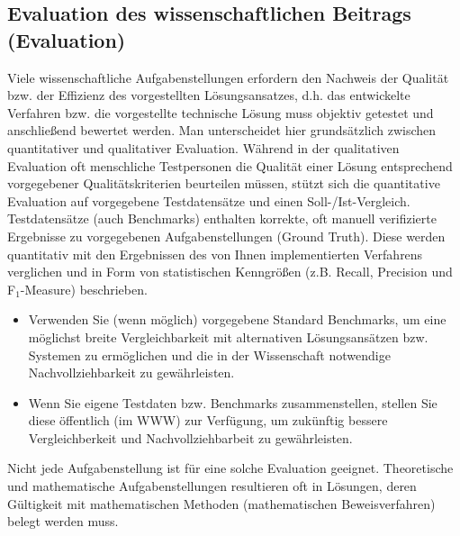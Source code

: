 \subsection{Evaluation des wissenschaftlichen Beitrags (Evaluation)}
%
Viele wissenschaftliche Aufgabenstellungen erfordern den Nachweis der Qualität bzw. der Effizienz des vorgestellten Lösungsansatzes, d.h. das entwickelte Verfahren bzw. die vorgestellte technische Lösung muss objektiv getestet und anschließend bewertet werden.
Man unterscheidet hier grundsätzlich zwischen quantitativer und qualitativer Evaluation.
Während in der qualitativen Evaluation oft menschliche Testpersonen die Qualität einer Lösung entsprechend vorgegebener Qualitätskriterien beurteilen müssen, stützt sich die quantitative Evaluation auf vorgegebene Testdatensätze und einen Soll-/Ist-Vergleich.
Testdatensätze (auch Benchmarks) enthalten korrekte, oft manuell verifizierte Ergebnisse zu vorgegebenen Aufgabenstellungen (Ground Truth).
Diese werden quantitativ mit den Ergebnissen des von Ihnen implementierten Verfahrens verglichen und in Form von statistischen Kenngrößen (z.B. Recall, Precision und F$_1$-Measure) beschrieben.

\begin{itemize}
\item Verwenden Sie (wenn möglich) vorgegebene Standard Benchmarks, um eine möglichst breite Vergleichbarkeit mit alternativen Lösungsansätzen bzw. Systemen zu ermöglichen und die in der Wissenschaft notwendige Nachvollziehbarkeit zu gewährleisten.
\item Wenn Sie eigene Testdaten bzw. Benchmarks zusammenstellen, stellen Sie diese öffentlich (im WWW) zur Verfügung, um zukünftig bessere Vergleichberkeit und Nachvollziehbarbeit zu gewährleisten.
\end{itemize}


Nicht jede Aufgabenstellung ist für eine solche Evaluation geeignet. Theoretische und mathematische Aufgabenstellungen resultieren oft in Lösungen, deren Gültigkeit mit mathematischen Methoden (mathematischen Beweisverfahren) belegt werden muss.



